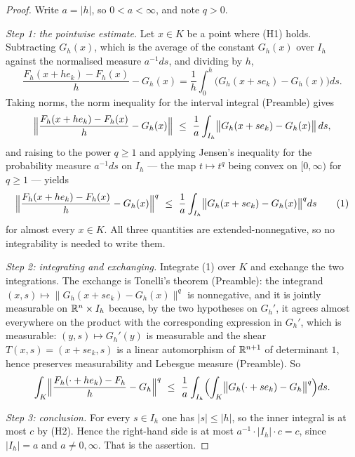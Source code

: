 \begin{proof}
Write $a=|h|$, so $0<a<\infty$, and note $q>0$.

\emph{Step 1: the pointwise estimate.}  Let $x\in K$ be a point where (H1)
holds.  Subtracting $G_h(x)$, which is the average of the constant $G_h(x)$
over $I_h$ against the normalised measure $a^{-1}ds$, and dividing by $h$,
\[
\frac{F_h(x+he_k)-F_h(x)}{h}-G_h(x)
=\frac1h\int_0^h\bigl(G_h(x+se_k)-G_h(x)\bigr)ds .
\]
Taking norms, the norm inequality for the interval integral (Preamble) gives
\[
\Bigl\|\frac{F_h(x+he_k)-F_h(x)}{h}-G_h(x)\Bigr\|
\ \le\ \frac1a\int_{I_h}\bigl\|G_h(x+se_k)-G_h(x)\bigr\|\,ds ,
\]
and raising to the power $q\ge1$ and applying Jensen's inequality for the
probability measure $a^{-1}ds$ on $I_h$ --- the map $t\mapsto t^{q}$ being
convex on $[0,\infty)$ for $q\ge1$ --- yields
\[
\Bigl\|\frac{F_h(x+he_k)-F_h(x)}{h}-G_h(x)\Bigr\|^{q}
\ \le\ \frac1a\int_{I_h}\bigl\|G_h(x+se_k)-G_h(x)\bigr\|^{q}ds
\tag{1}
\]
for almost every $x\in K$.  All three quantities are extended-nonnegative, so
no integrability is needed to write them.

\emph{Step 2: integrating and exchanging.}  Integrate (1) over $K$ and exchange
the two integrations.  The exchange is Tonelli's theorem (Preamble): the
integrand $(x,s)\mapsto\|G_h(x+se_k)-G_h(x)\|^{q}$ is nonnegative, and it is
jointly measurable on $\mathbb{R}^n\times I_h$ because, by the two hypotheses on
$G_h'$, it agrees almost everywhere on the product with the corresponding
expression in $G_h'$, which is measurable: $(y,s)\mapsto G_h'(y)$ is measurable
and the shear $T(x,s)=(x+se_k,s)$ is a linear automorphism of $\mathbb{R}^{n+1}$ of
determinant $1$, hence preserves measurability and Lebesgue measure
(Preamble).  So
\[
\int_K\Bigl\|\frac{F_h(\cdot+he_k)-F_h}{h}-G_h\Bigr\|^{q}
\ \le\ \frac1a\int_{I_h}\Bigl(\int_K\bigl\|G_h(\cdot+se_k)-G_h\bigr\|^{q}\Bigr)ds .
\]

\emph{Step 3: conclusion.}  For every $s\in I_h$ one has $|s|\le|h|$, so the
inner integral is at most $c$ by (H2).  Hence the right-hand side is at most
$a^{-1}\cdot|I_h|\cdot c=c$, since $|I_h|=a$ and $a\ne0,\infty$.  That is the
assertion.
\end{proof}
